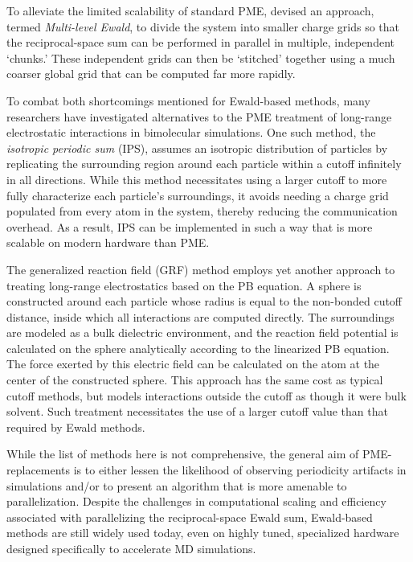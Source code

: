 To alleviate the limited scalability of standard PME,
\citeauthor{Cerutti_JChemTheoryComput_2010_v6_p443} devised an approach, termed
\emph{Multi-level Ewald}, to divide the system into smaller charge grids so that
the reciprocal-space sum can be performed in parallel in multiple, independent
`chunks.' \cite{Cerutti_JChemTheoryComput_2010_v6_p443} These independent grids
can then be `stitched' together using a much coarser global grid that can be
computed far more rapidly.

To combat both shortcomings mentioned for Ewald-based methods, many researchers
have investigated alternatives to the PME treatment of long-range electrostatic
interactions in bimolecular simulations.  One such method, the \emph{isotropic
periodic sum} (IPS), assumes an isotropic distribution of particles by
replicating the surrounding region around each particle within a cutoff
infinitely in all directions. \cite{Wu_JChemPhys_2005_v122_p044107} While this
method necessitates using a larger cutoff to more fully characterize each
particle's surroundings, it avoids needing a charge grid populated from every
atom in the system, thereby reducing the communication overhead. As a result,
IPS can be implemented in such a way that is more scalable on modern hardware
than PME.

The generalized reaction field (GRF) method employs yet another approach to
treating long-range electrostatics based on the PB equation. A sphere is
constructed around each particle whose radius is equal to the non-bonded cutoff
distance, inside which all interactions are computed directly. The surroundings
are modeled as a bulk dielectric environment, and the reaction field potential
is calculated on the sphere analytically according to the linearized PB
equation. The force exerted by this electric field can be calculated on the atom
at the center of the constructed sphere. \cite{Tironi_JChemPhys_1995_v102_p5451}
This approach has the same cost as typical cutoff methods, but models
interactions outside the cutoff as though it were bulk solvent. Such treatment
necessitates the use of a larger cutoff value than that required by Ewald
methods.

While the list of methods here is not comprehensive, the general aim of
PME-replacements is to either lessen the likelihood of observing periodicity
artifacts in simulations and/or to present an algorithm that is more amenable to
parallelization. Despite the challenges in computational scaling and efficiency
associated with parallelizing the reciprocal-space Ewald sum, Ewald-based
methods are still widely used today, even on highly tuned, specialized hardware
designed specifically to accelerate MD simulations. \cite{Anton}

